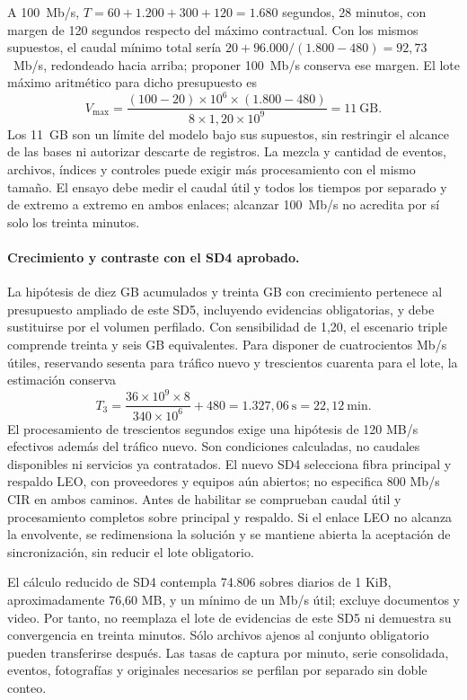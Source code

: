 A 100~Mb/s, \(T=60+1.200+300+120=1.680\) segundos, 28 minutos, con margen de 120 segundos respecto del máximo contractual. Con los mismos supuestos, el caudal mínimo total sería \(20+96.000/(1.800-480)=92{,}73\)~Mb/s, redondeado hacia arriba; proponer 100~Mb/s conserva ese margen. El lote máximo aritmético para dicho presupuesto es
\[
V_{\max}=\frac{(100-20)\times10^6\times(1.800-480)}{8\times1{,}20\times10^9}
=11\ \mbox{GB}.
\]
Los 11~GB son un límite del modelo bajo sus supuestos, sin restringir el alcance de las bases ni autorizar descarte de registros. La mezcla y cantidad de eventos, archivos, índices y controles puede exigir más procesamiento con el mismo tamaño. El ensayo debe medir el caudal útil y todos los tiempos por separado y de extremo a extremo en ambos enlaces; alcanzar 100~Mb/s no acredita por sí solo los treinta minutos.

\paragraph{Crecimiento y contraste con el SD4 aprobado.}
La hipótesis de diez GB acumulados y treinta GB con crecimiento pertenece al presupuesto ampliado de este SD5, incluyendo evidencias obligatorias, y debe sustituirse por el volumen perfilado. Con sensibilidad de 1,20, el escenario triple comprende treinta y seis GB equivalentes. Para disponer de cuatrocientos Mb/s útiles, reservando sesenta para tráfico nuevo y trescientos cuarenta para el lote, la estimación conserva
\[
T_3=\frac{36\times10^9\times8}{340\times10^6}+480
=1.327{,}06\ \mathrm{s}=22{,}12\ \mathrm{min}.
\]
El procesamiento de trescientos segundos exige una hipótesis de 120 MB/s efectivos además del tráfico nuevo. Son condiciones calculadas, no caudales disponibles ni servicios ya contratados. El nuevo SD4 selecciona fibra principal y respaldo LEO, con proveedores y equipos aún abiertos; no especifica 800 Mb/s CIR en ambos caminos. Antes de habilitar se comprueban caudal útil y procesamiento completos sobre principal y respaldo. Si el enlace LEO no alcanza la envolvente, se redimensiona la solución y se mantiene abierta la aceptación de sincronización, sin reducir el lote obligatorio.

El cálculo reducido de SD4 contempla 74.806 sobres diarios de 1 KiB, aproximadamente 76,60 MB, y un mínimo de un Mb/s útil; excluye documentos y video. Por tanto, no reemplaza el lote de evidencias de este SD5 ni demuestra su convergencia en treinta minutos. Sólo archivos ajenos al conjunto obligatorio pueden transferirse después. Las tasas de captura por minuto, serie consolidada, eventos, fotografías y originales necesarios se perfilan por separado sin doble conteo.

